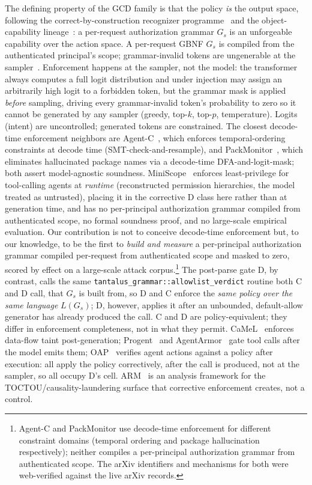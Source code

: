The defining property of the GCD family is that the policy \emph{is} the output space, following the correct-by-construction recognizer programme~\cite{sassaman2013langsec} and the object-capability lineage~\cite{dennisvanhorn1966,miller2006}: a per-request authorization grammar \(G_s\) is an unforgeable capability over the action space. A per-request GBNF \(G_s\) is compiled from the authenticated principal's scope; grammar-invalid tokens are ungenerable at the sampler~\cite{willard2023,dong2024xgrammar}. Enforcement happens at the sampler, not the model: the transformer always computes a full logit distribution and under injection may assign an arbitrarily high logit to a forbidden token, but the grammar mask is applied \emph{before} sampling, driving every grammar-invalid token's probability to zero so it cannot be generated by any sampler (greedy, top-\(k\), top-\(p\), temperature). Logits (intent) are uncontrolled; generated tokens are constrained. The closest decode-time enforcement neighbors are Agent-C~\cite{agentc2025}, which enforces temporal-ordering constraints at decode time (SMT-check-and-resample), and PackMonitor~\cite{packmonitor2026}, which eliminates hallucinated package names via a decode-time DFA-and-logit-mask; both assert model-agnostic soundness. MiniScope~\cite{miniscope2025} enforces least-privilege for tool-calling agents at \emph{runtime} (reconstructed permission hierarchies, the model treated as untrusted), placing it in the corrective D class here rather than at generation time, and has no per-principal authorization grammar compiled from authenticated scope, no formal soundness proof, and no large-scale empirical evaluation. Our contribution is not to conceive decode-time enforcement but, to our knowledge, to be the first to \emph{build and measure} a per-principal authorization grammar compiled per-request from authenticated scope and masked to zero, scored by effect on a large-scale attack corpus.\footnote{Agent-C and PackMonitor use decode-time enforcement for different constraint domains (temporal ordering and package hallucination respectively); neither compiles a per-principal authorization grammar from authenticated scope. The arXiv identifiers and mechanisms for both were web-verified against the live arXiv records.} The post-parse gate D, by contrast, calls the same \texttt{tantalus\_grammar::allowlist\_verdict} routine both C and D call, that \(G_s\) is built from, so D and C enforce the \emph{same policy over the same language} \(L(G_s)\); D, however, applies it after an unbounded, default-allow generator has already produced the call. C and D are policy-equivalent; they differ in enforcement completeness, not in what they permit. CaMeL~\cite{camel2025} enforces data-flow taint post-generation; Progent~\cite{progent2025} and AgentArmor~\cite{agentarmor2025} gate tool calls after the model emits them; OAP~\cite{oap2026} verifies agent actions against a policy after execution: all apply the policy correctively, after the call is produced, not at the sampler, so all occupy D's cell. ARM~\cite{arm2026} is an analysis framework for the TOCTOU/causality-laundering surface that corrective enforcement creates, not a control.


